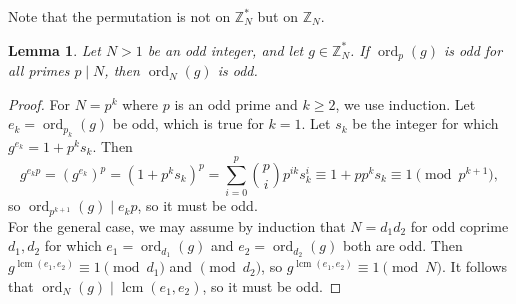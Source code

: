 \documentclass[10pt]{article}
\newtheorem{lemma}{Lemma}
\theoremstyle{definition}
\newcommand{\qmod}[1]{\!\!\!\pmod{#1}}
\newcommand{\Z}{\mathbb{Z}}
\DeclareMathOperator{\ord}{ord}
\DeclareMathOperator{\lcm}{lcm}
\begin{document}
Note that the permutation is not on $ \Z_N^{\ast} $ but on $ \Z_N $.

\begin{lemma} \label{lem:order}
    Let $ N > 1 $ be an odd integer, and let $ g \in \Z_N^{\ast} $. If $ \ord_p(g) $ is odd for all primes
    $ p \mid N $, then $ \ord_N(g) $ is odd.
\end{lemma}

\begin{proof}
    For $ N = p^k $ where $ p $ is an odd prime and $ k \geq 2 $, we use induction. Let
    $ e_k = \ord_{p_k}(g) $ be odd, which is true for $ k = 1 $. Let $ s_k $ be the integer for which
    $ g^{e_k} = 1 + p^k s_k $. Then
    \[ g^{e_k p} = \left(g^{e_k}\right)^p = (1 + p^k s_k)^p = \sum_{i=0}^{p} \binom{p}{i} p^{i k} s_k^i
    \equiv 1 + p p^k s_k \equiv 1 \pmod{p^{k+1}} , \]
    so $ \ord_{p^{k+1}}(g) \mid e_k p $, so it must be odd. \\
    For the general case, we may assume by induction that $ N = d_1 d_2 $ for odd coprime $ d_1, d_2 $
    for which $ e_1 = \ord_{d_1}(g) $ and $ e_2 = \ord_{d_2}(g) $ both are odd. Then
    $ g^{\lcm(e_1,e_2)} \equiv 1 \pmod{d_1} $ and $ \qmod{d_2} $, so $ g^{\lcm(e_1,e_2)} \equiv 1 \pmod{N} $.
    It follows that $ \ord_N(g) \mid \lcm(e_1,e_2) $, so it must be odd.
\end{proof}
\end{document}

